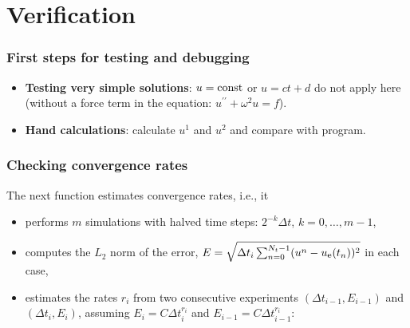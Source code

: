 \documentclass{beamer}
\begin{document}
\section{Verification}

\begin{frame}
\frametitle{First steps for testing and debugging}

\begin{itemize}
 \item \textbf{Testing very simple solutions}:
   $u=\hbox{const}$ or $u=ct + d$ do not apply here (without a force
   term in the equation: $u^{\prime\prime} + \omega^2u = f$).

 \item \textbf{Hand calculations}: calculate $u^1$ and $u^2$ and compare with program.
\end{itemize}

\noindent
\end{frame}

\begin{frame}
\frametitle{Checking convergence rates}

The next function estimates convergence rates, i.e., it

\begin{itemize}
 \item performs $m$ simulations with halved time steps: $2^{-k}\Delta t$, $k=0,\ldots,m-1$,

 \item computes the $L_2$ norm of the error,
   $E = \sqrt{\Delta t_i\sum_{n=0}^{N_t-1}(u^n-\uex(t_n))^2}$ in each case,

 \item estimates the rates $r_i$ from two consecutive
   experiments $(\Delta t_{i-1}, E_{i-1})$ and $(\Delta t_{i}, E_{i})$,
   assuming $E_i=C\Delta t_i^{r_i}$ and $E_{i-1}=C\Delta t_{i-1}^{r_i}$:
\end{itemize}

\noindent
\end{frame}
\end{document}
